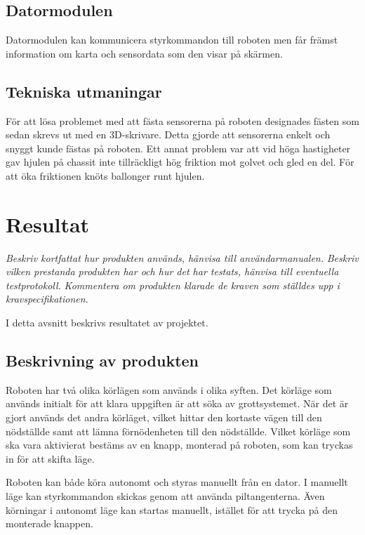 \documentclass[11pt]{article}
\begin{document}
\begin{flushleft}
\subsection{Datormodulen}
Datormodulen kan kommunicera styrkommandon till roboten men får främst information om karta och sensordata som den visar på skärmen. 

\subsection{Tekniska utmaningar}
För att lösa problemet med att fästa sensorerna på roboten designades fästen som sedan skrevs ut med en 3D-skrivare. Detta gjorde att sensorerna enkelt och snyggt kunde fästas på roboten. Ett annat problem var att vid höga hastigheter gav hjulen på chassit inte tillräckligt hög friktion mot golvet och gled en del. För att öka friktionen knöts ballonger runt hjulen.

\pagebreak

\section{Resultat}
\textit{Beskriv kortfattat hur produkten används, hänvisa till användarmanualen.}
\textit{Beskriv vilken prestanda produkten har och hur det har testats, hänvisa till eventuella testprotokoll.}
\textit{Kommentera om produkten klarade de kraven som ställdes upp i kravspecifikationen. }

I detta avsnitt beskrivs resultatet av projektet.
\subsection{Beskrivning av produkten}
Roboten har två olika körlägen som används i olika syften. Det körläge som används initialt för att klara uppgiften är att söka av grottsystemet. När det är gjort används det andra körläget, vilket hittar den kortaste vägen till den nödställde samt att lämna förnödenheten till den nödställde. Vilket körläge som ska vara aktivierat bestäms av en knapp, monterad på roboten, som kan tryckas in för att skifta läge. 


Roboten kan både köra autonomt och styras manuellt från en dator. I manuellt läge kan styrkommandon skickas genom att använda piltangenterna. Även körningar i autonomt läge kan startas manuellt, istället för att trycka på den monterade knappen. 


\end{flushleft}
\end{document}
